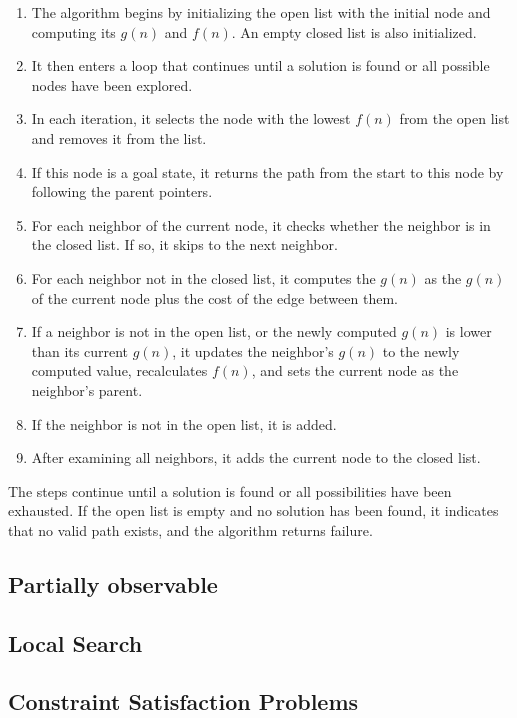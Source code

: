 \documentclass[a4paper,UKenglish,cleveref, autoref, thm-restate]{qlinhta}
\begin{document}
    \begin{enumerate}
        \item The algorithm begins by initializing the open list with the initial node and computing its $g(n)$ and $f(n)$. An empty closed list is also initialized.
        \item It then enters a loop that continues until a solution is found or all possible nodes have been explored.
        \item In each iteration, it selects the node with the lowest $f(n)$ from the open list and removes it from the list.
        \item If this node is a goal state, it returns the path from the start to this node by following the parent pointers.
        \item For each neighbor of the current node, it checks whether the neighbor is in the closed list. If so, it skips to the next neighbor.
        \item For each neighbor not in the closed list, it computes the $g(n)$ as the $g(n)$ of the current node plus the cost of the edge between them.
        \item If a neighbor is not in the open list, or the newly computed $g(n)$ is lower than its current $g(n)$, it updates the neighbor's $g(n)$ to the newly computed value, recalculates $f(n)$, and sets the current node as the neighbor's parent.
        \item If the neighbor is not in the open list, it is added.
        \item After examining all neighbors, it adds the current node to the closed list.
    \end{enumerate}

    The steps continue until a solution is found or all possibilities have been exhausted. If the open list is empty and no solution has been found, it indicates that no valid path exists, and the algorithm returns failure.

    \subsection{Partially observable}

    \subsection{Local Search}

    \subsection{Constraint Satisfaction Problems}
\end{document}
